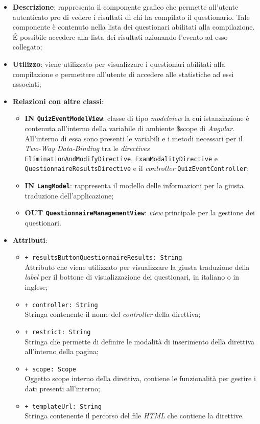 \begin{itemize}
	\item \textbf{Descrizione}: rappresenta il componente grafico che permette all'utente autenticato pro di vedere i risultati di chi ha compilato il questionario. Tale componente è contenuto nella lista dei questionari abilitati alla compilazione. \'E possibile accedere alla lista dei risultati azionando l'evento ad esso collegato;
	\item \textbf{Utilizzo}: viene utilizzato per visualizzare i questionari abilitati alla compilazione e permettere all'utente di accedere alle statistiche ad essi associati;
	\item \textbf{Relazioni con altre classi}: 
	\begin{itemize} 
		\item \textbf{IN \texttt{QuizEventModelView}}: classe di tipo \textit{modelview} la cui istanziazione è contenuta all'interno della variabile di ambiente \$scope di \textit{Angular}. All'interno di essa sono presenti le variabili e i metodi necessari per il \textit{Two-Way Data-Binding} tra le \textit{directives} \texttt{EliminationAndModifyDirective}, \texttt{ExamModalityDirective} e \texttt{QuestionnaireResultsDirective} e il \textit{controller} \texttt{QuizEventController};
		\item \textbf{IN \texttt{LangModel}}: rappresenta il modello delle informazioni per la giusta traduzione dell'applicazione;
		\item \textbf{OUT \texttt{QuestionnaireManagementView}}: \textit{view} principale per la gestione dei questionari.
	\end{itemize}
	\item \textbf{Attributi}: 
	\begin{itemize}
		\item \texttt{+ resultsButtonQuestionnaireResults: String} \\ Attributo che viene utilizzato per visualizzare la giusta traduzione della \textit{label} per il bottone di visualizzazione dei questionari, in italiano o in inglese;
		\item \texttt{+ controller: String} \\ Stringa contenente il nome del \textit{controller} della direttiva;
		\item \texttt{+ restrict: String} \\ Stringa che permette di definire le modalità di inserimento della direttiva all'interno della pagina;
		\item \texttt{+ scope: Scope} \\ Oggetto scope interno della direttiva, contiene le funzionalità per gestire i dati presenti all'interno;
		\item \texttt{+ templateUrl: String} \\ Stringa contenente il percorso del file \textit{HTML} che contiene la direttive.
	\end{itemize} 
\end{itemize}
